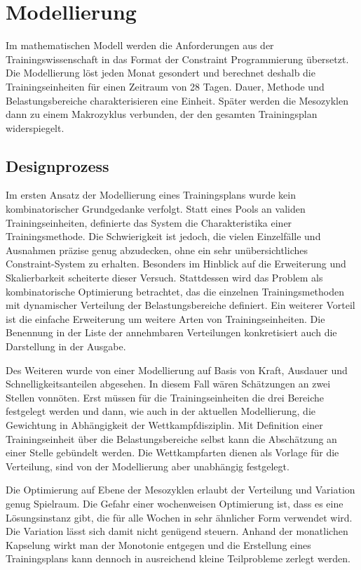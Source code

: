 \chapter{Modellierung}
\label{sec:modellierung}
Im mathematischen Modell werden die Anforderungen aus der Trainingswissenschaft in das Format der Constraint Programmierung übersetzt. Die Modellierung löst jeden Monat gesondert und berechnet deshalb die Trainingseinheiten für einen Zeitraum von 28 Tagen. Dauer, Methode und Belastungsbereiche charakterisieren eine Einheit. Später werden die Mesozyklen dann zu einem Makrozyklus verbunden, der den gesamten Trainingsplan widerspiegelt.

\section{Designprozess}
Im ersten Ansatz der Modellierung eines Trainingsplans wurde kein kombinatorischer Grundgedanke verfolgt. Statt eines Pools an validen Trainingseinheiten, definierte das System die Charakteristika einer Trainingsmethode. Die Schwierigkeit ist jedoch, die vielen Einzelfälle und Ausnahmen präzise genug abzudecken, ohne ein sehr unübersichtliches Constraint-System zu erhalten. Besonders im Hinblick auf die Erweiterung und Skalierbarkeit scheiterte dieser Versuch. Stattdessen wird das Problem als kombinatorische Optimierung betrachtet, das die einzelnen Trainingsmethoden mit dynamischer Verteilung der Belastungsbereiche definiert. Ein weiterer Vorteil ist die einfache Erweiterung um weitere Arten von Trainingseinheiten. Die Benennung in der Liste der annehmbaren Verteilungen konkretisiert auch die Darstellung in der Ausgabe. \par
Des Weiteren wurde von einer Modellierung auf Basis von Kraft, Ausdauer und Schnelligkeitsanteilen abgesehen. In diesem Fall wären Schätzungen an zwei Stellen vonnöten. Erst müssen für die Trainingseinheiten die drei Bereiche festgelegt werden und dann, wie auch in der aktuellen Modellierung, die Gewichtung in Abhängigkeit der Wettkampfdisziplin. Mit Definition einer Trainingseinheit über die Belastungsbereiche selbst kann die Abschätzung an einer Stelle gebündelt werden. Die Wettkampfarten dienen als Vorlage für die Verteilung, sind von der Modellierung aber unabhängig festgelegt. \par
Die Optimierung auf Ebene der Mesozyklen erlaubt der Verteilung und Variation genug Spielraum. Die Gefahr einer wochenweisen Optimierung ist, dass es eine Lösungsinstanz gibt, die für alle Wochen in sehr ähnlicher Form verwendet wird. Die Variation lässt sich damit nicht genügend steuern. Anhand der monatlichen Kapselung wirkt man der Monotonie entgegen und die Erstellung eines Trainingsplans kann dennoch in ausreichend kleine Teilprobleme zerlegt werden.

